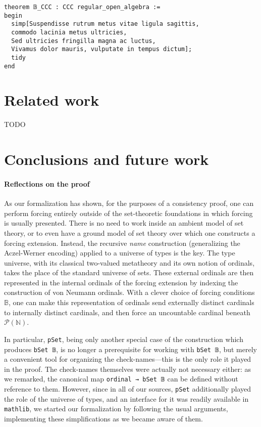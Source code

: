 \documentclass[a4paper,USenglish,cleveref, autoref]{lipics-v2019}
\newcommand{\B}{\mathbb{B}}
\newcommand{\lil}{\lstinline}
\newcommand{\N}{\mathbb{N}}
\theoremstyle{definition}
\begin{document}
\begin{lstlisting}
theorem 𝔹_CCC : CCC regular_open_algebra :=
begin
  simp[Suspendisse rutrum metus vitae ligula sagittis,
  commodo lacinia metus ultricies,
  Sed ultricies fringilla magna ac luctus,
  Vivamus dolor mauris, vulputate in tempus dictum];
  tidy
end
\end{lstlisting}

\section{Related work}
TODO

\section{Conclusions and future work}
\paragraph*{Reflections on the proof}
As our formalization has shown, for the purposes of a consistency proof, one can perform forcing entirely outside of the set-theoretic foundations in which forcing is usually presented. There is no need to work inside an ambient model of set theory, or to even have a ground model of set theory over which one constructs a forcing extension. Instead, the recursive \emph{name} construction (generalizing the Aczel-Werner encoding) applied to a universe of types is the key. The type universe, with its classical two-valued metatheory and its own notion of ordinals, takes the place of the standard universe of sets. These external ordinals are then represented in the internal ordinals of the forcing extension by indexing the construction of von Neumann ordinals. With a clever choice of forcing conditions $\B$, one can make this representation of ordinals send externally distinct cardinals to internally distinct cardinals, and then force an uncountable cardinal beneath $\mathcal{P}(\N)$.

In particular, \lstinline{pSet}, being only another special case of the construction which produces \lstinline{bSet 𝔹}, is no longer a prerequisite for working with \lstinline{bSet 𝔹}, but merely a convenient tool for organizing the check-names---this is the only role it played in the proof. The check-names themselves were actually not necessary either: as we remarked, the canonical map \lil{ordinal → bSet 𝔹} can be defined without reference to them. However, since in all of our sources, \lstinline{pSet} additionally played the role of the universe of types, and an interface for it was readily available in \lstinline{mathlib}, we started our formalization by following the usual arguments, implementing these simplifications as we became aware of them.
\end{document}
